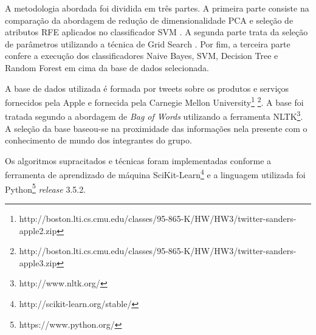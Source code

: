 A metodologia abordada foi dividida em três partes. A primeira parte consiste na comparação da abordagem de redução de dimensionalidade PCA \cite{Jolliffe:2002} e seleção de atributos RFE \cite{Guyon2003} aplicados no classificador SVM \cite{MachineLearning:Michalski:2013}. A segunda parte trata da seleção de parâmetros utilizando a técnica de Grid Search \cite{SnoekLA12}. Por fim, a terceira parte confere a execução dos classificadores Naive Bayes, SVM, Decision Tree e Random Forest \cite{MachineLearning:Michalski:2013} em cima da base de dados selecionada.

A base de dados utilizada é formada por tweets sobre os produtos e serviços fornecidos pela Apple e fornecida pela Carnegie Mellon University\footnote{http://boston.lti.cs.cmu.edu/classes/95-865-K/HW/HW3/twitter-sanders-apple2.zip} \footnote{http://boston.lti.cs.cmu.edu/classes/95-865-K/HW/HW3/twitter-sanders-apple3.zip}. A base foi tratada segundo a abordagem de \textit{Bag of Words} utilizando a ferramenta NLTK\footnote{http://www.nltk.org/}. A seleção da base baseou-se na proximidade das informações nela presente com o conhecimento de mundo dos integrantes do grupo.

Os algoritmos supracitados e técnicas foram implementadas conforme a ferramenta de aprendizado de máquina SciKit-Learn\footnote{http://scikit-learn.org/stable/} e a linguagem utilizada foi Python\footnote{https://www.python.org/} \textit{release} 3.5.2.
